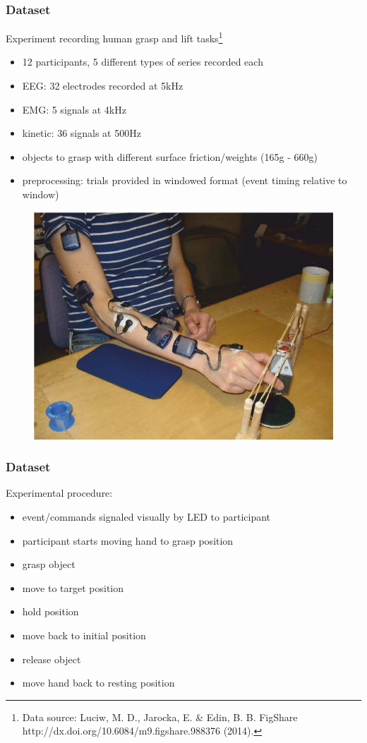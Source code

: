 \documentclass{beamer}
\begin{document}
\begin{frame}
\frametitle{Dataset}
Experiment recording human grasp and lift tasks\footnote{Data source: Luciw, M. D., Jarocka, E. \& Edin, B. B. FigShare http://dx.doi.org/10.6084/m9.figshare.988376 (2014).}
\begin{itemize}
	\item 12 participants, 5 different types of series recorded each
	\item EEG: 32 electrodes recorded at 5kHz
	\item EMG: 5 signals at 4kHz
	\item kinetic: 36 signals at 500Hz
	\item objects to grasp with different surface friction/weights (165g - 660g)
	\item preprocessing: trials provided in windowed format (event timing relative to window)
\end{itemize}
\begin{figure}[ht]
    \centering
    \includegraphics[scale=.15]{experiment.png}
	\label{fig1}
\end{figure}
\end{frame}


\begin{frame}
\frametitle{Dataset}

Experimental procedure:
\begin{itemize}
	\item event/commands signaled visually by LED to participant
	\item participant starts moving hand to grasp position
    \item grasp object
    \item move to target position
    \item hold position
    \item move back to initial position
    \item release object
    \item move hand back to resting position
\end{itemize}
	
\end{frame}
\end{document}
